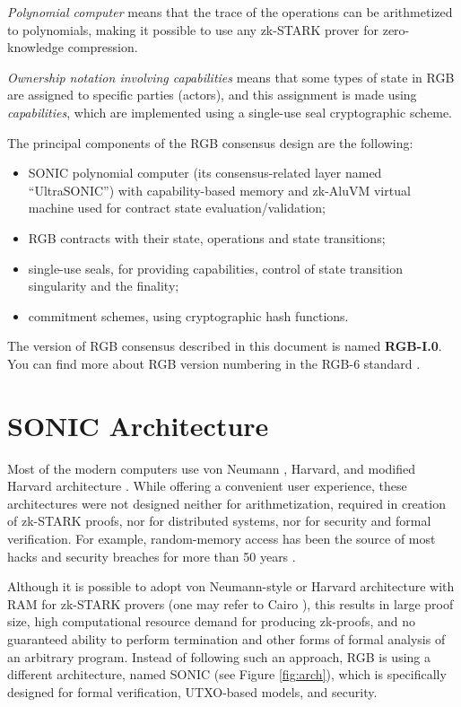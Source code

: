 \documentclass[9pt,oneside]{amsart}
\begin{document}
\begin{multicols}{2}
\emph{Polynomial computer} means that the trace of the operations can be arithmetized to polynomials,
making it possible to use any zk-STARK prover for zero-knowledge compression.

\emph{Ownership notation involving capabilities} means that some types of state in RGB
are assigned to specific parties (actors), and this assignment is made using \emph{capabilities},
which are implemented using a single-use seal cryptographic scheme.

The principal components of the RGB consensus design are the following:
\begin{itemize}
  \item SONIC polynomial computer (its consensus-related layer named ``UltraSONIC'')
  with capability-based memory and zk-AluVM virtual machine
  used for contract state evaluation/validation;
  \item RGB contracts with their state, operations and state transitions;
  \item single-use seals, for providing capabilities,
  control of state transition singularity and the finality;
  \item commitment schemes, using cryptographic hash functions.
\end{itemize}

The version of RGB consensus described in this document is named \textbf{RGB-I.0}.
You can find more about RGB version numbering in the RGB-6 standard \cite{RGB6}.

\section{SONIC Architecture}\label{Sonic}

Most of the modern computers use von Neumann \cite{vonNeumann},
Harvard, and modified Harvard architecture \cite{Harvard}.
While offering a convenient user experience, these architectures were not designed neither for
arithmetization, required in creation of zk-STARK proofs, nor for distributed systems,
nor for security and formal verification.
For example, random-memory access has been the source
of most hacks and security breaches for more than 50 years \cite{RAMsucks1, RAMsucks2, RAMsucks3}.

Although it is possible to adopt von Neumann-style or Harvard architecture
with RAM for zk-STARK provers (one may refer to Cairo \cite{Cairo}),
this results in large proof size,
high computational resource demand for producing zk-proofs,
and no guaranteed ability to perform termination and
other forms of formal analysis of an arbitrary program.
Instead of following such an approach, RGB is using a different architecture,
named SONIC (see Figure \ref{fig:arch}),
which is specifically designed for formal verification, UTXO-based models, and security.

\end{multicols}
\end{document}

